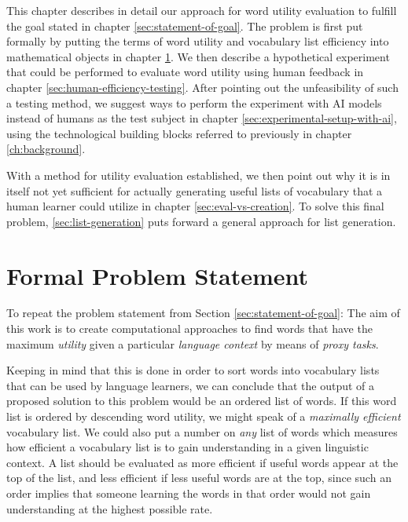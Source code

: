 This chapter describes in detail our approach for word utility evaluation to fulfill the goal stated in chapter \ref{sec:statement-of-goal}.
The problem is first put formally by putting the terms of word utility and vocabulary list efficiency into mathematical objects in chapter \ref{sec:formal-problem-statement}.
We then describe a hypothetical experiment that could be performed to evaluate word utility using human feedback in chapter \ref{sec:human-efficiency-testing}.
After pointing out the unfeasibility of such a testing method, we suggest ways to perform the experiment with AI models instead of humans as the test subject in chapter \ref{sec:experimental-setup-with-ai}, using the technological building blocks referred to previously in chapter \ref{ch:background}.

With a method for utility evaluation established, we then point out why it is in itself not yet sufficient for actually generating useful lists of vocabulary that a human learner could utilize in chapter \ref{sec:eval-vs-creation}.
To solve this final problem, \ref{sec:list-generation} puts forward a general approach for list generation.

\section{Formal Problem Statement} \label{sec:formal-problem-statement}


To repeat the problem statement from Section \ref{sec:statement-of-goal}:
The aim of this work is to create computational approaches to find words that have the maximum \textit{utility} given a particular \textit{language context} by means of \textit{proxy tasks}.

Keeping in mind that this is done in order to sort words into vocabulary lists that can be used by language learners, we can conclude that the output of a proposed solution to this problem would be an ordered list of words.
If this word list is ordered by descending word utility, we might speak of a \textit{maximally efficient} vocabulary list.
We could also put a number on \textit{any} list of words which measures how efficient a vocabulary list is to gain understanding in a given linguistic context.
A list should be evaluated as more efficient if useful words appear at the top of the list, and less efficient if less useful words are at the top, since such an order implies that someone learning the words in that order would not gain understanding at the highest possible rate.

